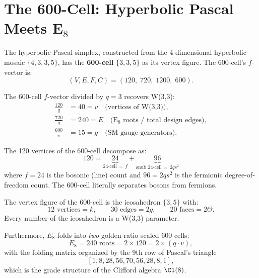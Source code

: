 \section{\texorpdfstring{The 600-Cell: Hyperbolic Pascal Meets E${}_8$}{The 600-Cell: Hyperbolic Pascal Meets E8}}
\label{sec:600cell}

The hyperbolic Pascal simplex, constructed from the $4$-dimensional
hyperbolic mosaic $\{4,3,3,5\}$, has the \textbf{600-cell} $\{3,3,5\}$
as its vertex figure. The 600-cell's $f$-vector is:
\begin{equation}
(V,E,F,C) = (120,\; 720,\; 1200,\; 600).
\end{equation}

\begin{theorem}[600-Cell $=$ W(3,3) $\times\, q$]
\label{thm:600cell}
The 600-cell $f$-vector divided by $q=3$ recovers W(3,3):
\begin{align}
\frac{120}{q} &= 40 = v \quad\text{(vertices of W(3,3))}, \\
\frac{720}{q} &= 240 = E \quad\text{(E${}_8$ roots / total design edges)}, \\
\frac{600}{v} &= 15 = g \quad\text{(SM gauge generators)}.
\end{align}
\end{theorem}

\begin{theorem}
The 120 vertices of the 600-cell decompose as:
\begin{equation}
120 = \underbrace{24}_{\text{24-cell}\,=\,f} + \underbrace{96}_{\text{snub 24-cell}\,=\,2q s^2}
\end{equation}
where $f=24$ is the bosonic (line) count and $96 = 2qs^2$ is the
fermionic degree-of-freedom count. The 600-cell literally
separates bosons from fermions.
\end{theorem}

\begin{corollary}[Icosahedron $=$ W(3,3) Vertex Figure]
The vertex figure of the 600-cell is the icosahedron $\{3,5\}$ with:
\begin{equation}
12\text{ vertices} = k,\qquad 30\text{ edges} = 2g,\qquad 20\text{ faces} = 2\Theta.
\end{equation}
Every number of the icosahedron is a W(3,3) parameter.
\end{corollary}

Furthermore, $E_8$ folds into \emph{two} golden-ratio-scaled 600-cells:
\begin{equation}
E_8 = 240\text{ roots} = 2\times 120 = 2\times(q\cdot v),
\end{equation}
with the folding matrix organized by the 9th row of Pascal's triangle
\[
[1,8,28,56,70,56,28,8,1],
\]
which is the grade structure of the Clifford algebra $\Cl(8)$.


